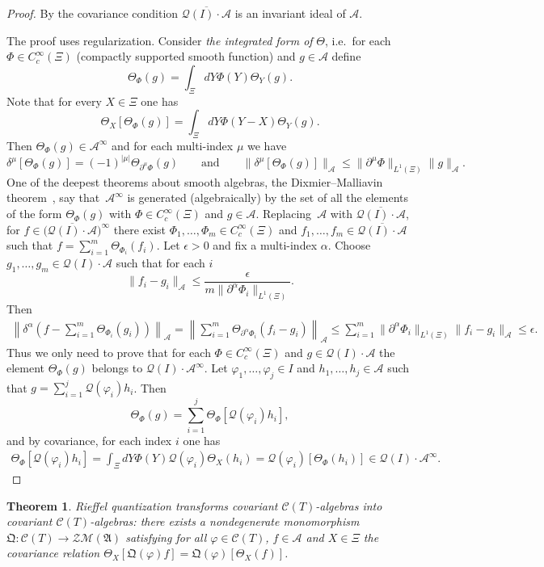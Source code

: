 \documentclass[11pt]{article}
\def\A{{\mathcal A}}
\def\Th{\Theta}
\def\QQ{\mathfrak Q}
\def\AA{\mathfrak A}
\def\C{\mathcal{C}}
\def\Q{\mathcal Q}
\newtheorem{Theorem}{Theorem}[section]
\begin{document}
\begin{proof}
By the covariance condition $\overline{\Q(I)\cdot\A}$ is an invariant ideal of $\A$.

The proof uses regularization. Consider {\it the integrated form of} $\Th$, i.e.\ for each $\Phi\in C_c^\infty(\Xi)$
(compactly supported smooth function) and $g\in\A$ def\/ine
\[
\Th_\Phi(g)=\int_\Xi dY\Phi(Y)\Th_Y(g).
\]
Note that for every $X\in\Xi$ one has
\[
\Th_X\left[\Th_\Phi(g)\right]=\int_\Xi dY\Phi(Y-X)\Th_Y(g).
\]
Then $\Th_\Phi(g)\in\A^\infty$ and for each multi-index $\mu$ we have
\[
\delta^{\mu}\left[\Th_\Phi(g)\right]=(-1)^{|\mu|}\Th_{\partial^{\mu}\Phi}(g)\qquad \text{and}\qquad
\|\delta^{\mu}\left[\Th_\Phi(g)\right]\|_\A \leq \|\partial^{\mu}\Phi\|_{L^1(\Xi)}
\| g\|_\A .
\]
One of the deepest theorems about smooth algebras, the Dixmier--Malliavin theorem~\cite{DM}, say that~$\A^\infty$
is generated (algebraically) by the set of all the elements of the form  $\Th_\Phi(g)$ with $\Phi\in C_c^\infty(\Xi)$ and
$g\in\A$. Replacing~$\A$ with $\overline{\Q(I)\cdot\A}$,
for $f\in\big(\overline{\Q(I)\cdot\A}\big)^\infty$ there exist $\Phi_1,\dots,\Phi_m\in C_c^\infty(\Xi)$ and
$f_1,\dots,f_m\in\overline{\Q(I)\cdot\A}$ such that $f=\sum\limits_{i=1}^m\Th_{\Phi_i}(f_i)$.
Let $\epsilon >0$ and f\/ix a multi-index $\alpha$. Choose $g_1,\dots ,g_m\in\Q(I)\cdot\A$ such that for each $i$
\[
\| f_i-g_i\|_\A \le\frac{\epsilon}{m\|\partial^\alpha\Phi_i\|_{L^1(\Xi)}} .
\]
Then
\begin{gather*}
\left\| \delta^\alpha \left(f-\sum_{i=1}^m\Th_{\Phi_i}(g_i)\right)\right\|_\A=
\left\|\sum_{i=1}^m\Th_{\partial^\alpha\Phi_i}(f_i-g_i)\right\|_\A
\leq
\sum_{i=1}^m\|\partial^\alpha\Phi_i\|_{L^1(\Xi)}\| f_i-g_i\|_\A \le\epsilon .
\end{gather*}
Thus we only need to prove that for each $\Phi\in C_c^\infty(\Xi)$ and $g\in\Q(I)\cdot\A$ the element
$\Th_\Phi(g)$ belongs to $\Q(I)\cdot\A^\infty$. Let $\varphi_1,\dots,\varphi_j\in I$ and
$h_1,\dots,h_j\in\A$ such that $g=\sum\limits_{i=1}^j\Q(\varphi_i)h_i$. Then
\[
\Th_\Phi(g)=\sum_{i=1}^j\Th_\Phi [\Q(\varphi_i)h_i ],
\]
and by covariance, for each index $i$ one has
\begin{gather*}
\Th_\Phi\left[\Q(\varphi_i)h_i\right]=\int_\Xi dY\Phi(Y)\Q(\varphi_i)\Th_X(h_i)=\Q(\varphi_i)
\left[\Th_\Phi(h_i)\right]\in\Q(I)\cdot\A^\infty .\tag*{\qed}
\end{gather*}
\renewcommand{\qed}{}
\end{proof}

\begin{Theorem}\label{crifel}
Rieffel quantization transforms covariant $\C(T)$-algebras into covariant $\C(T)$-algebras: there exists a nondegenerate
monomorphism $\mathfrak Q:\C(T)\rightarrow\mathcal Z\mathcal M(\AA)$ satisfying for all $\varphi\in\C(T)$, $f\in\A$ and
$X\in\Xi$ the covariance relation
$\Th_X[\QQ(\varphi)f]=\QQ(\varphi) [\Th_X(f) ]$.
\end{Theorem}
\end{document}
